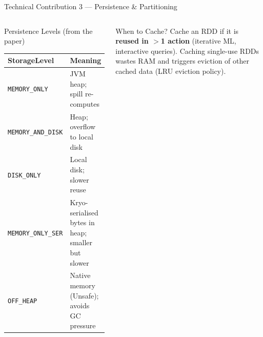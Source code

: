 \documentclass[aspectratio=169,10pt]{beamer}
\begin{document}
\begin{frame}{Technical Contribution 3 — Persistence \& Partitioning}
  \begin{columns}[T]
      \begin{block}{Persistence Levels (from the paper)}
        \renewcommand{\arraystretch}{1.25}
        \begin{tabular}{@{}lp{5.0cm}@{}}
          \toprule
          \textbf{StorageLevel} & \textbf{Meaning} \\
          \midrule
          \texttt{MEMORY\_ONLY}      & JVM heap; spill re-computes \\
          \texttt{MEMORY\_AND\_DISK} & Heap; overflow to local disk \\
          \texttt{DISK\_ONLY}        & Local disk; slower reuse \\
          \texttt{MEMORY\_ONLY\_SER} & Kryo-serialised bytes in heap;
                                       smaller but slower \\
          \texttt{OFF\_HEAP}         & Native memory (Unsafe);
                                       avoids GC pressure \\
          \bottomrule
        \end{tabular}
      \end{block}
      \vspace{5pt}
      \begin{alertblock}{When to Cache?}
        Cache an RDD if it is \textbf{reused in $>$1 action}
        (iterative ML, interactive queries).
        Caching single-use RDDs wastes RAM and triggers eviction
        of other cached data (LRU eviction policy).
      \end{alertblock}


\end{columns}
\end{frame}
\end{document}
